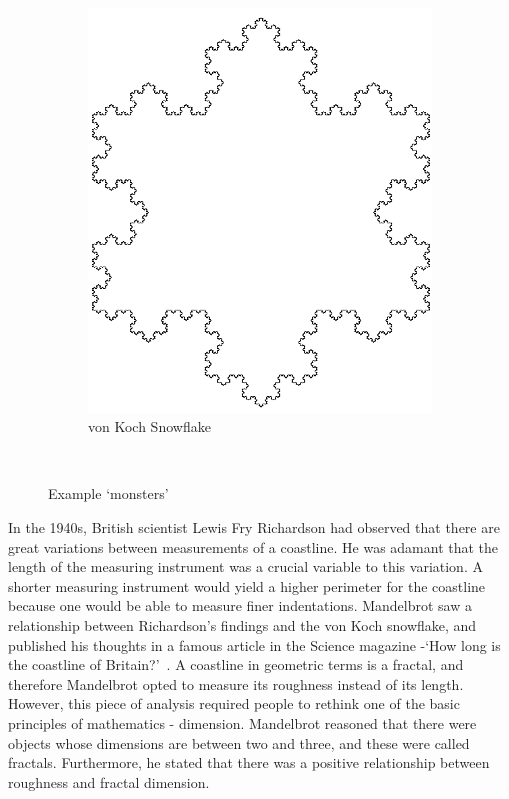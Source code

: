 \documentclass[a4paper]{article}
\begin{document}
\begin{figure}[h]
    \begin{subfigure}[h]{0.3\textwidth}
        \includegraphics[width=\textwidth]{koch_snowflake}
        \caption{von Koch Snowflake}
        \label{fig:gull}
    \end{subfigure}%
    ~ %
    \caption{Example `monsters'}\label{fig:animals}
\end{figure} 

In the 1940s, British scientist Lewis Fry Richardson had observed that there are great variations between measurements of a coastline. He was adamant that the length of the measuring instrument was a crucial variable to this variation. A shorter measuring instrument would yield a higher perimeter for the coastline because one would be able to measure finer indentations. Mandelbrot saw a relationship between Richardson’s findings and the von Koch snowflake, and published his thoughts in a famous article in the Science magazine -`How long is the coastline of Britain?'~\cite{Coastline}. A coastline in geometric terms is a fractal, and therefore Mandelbrot opted to measure its roughness instead of its length. However, this piece of analysis required people to rethink one of the basic principles of mathematics - dimension. Mandelbrot reasoned that there were objects whose dimensions are between two and three, and these were called fractals. Furthermore, he stated that there was a positive relationship between roughness and fractal dimension. 
\end{document}
